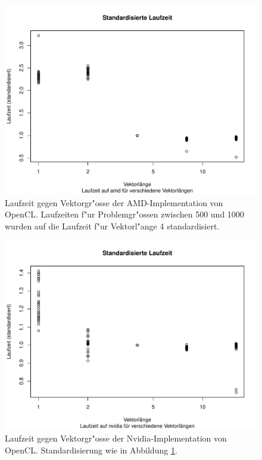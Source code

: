 \begin{figure}
\begin{center}
\includegraphics[width=\hsize]{images/vector-amd.pdf}
\end{center}
\caption{Laufzeit gegen Vektorgr"osse der AMD-Implementation von OpenCL.
Laufzeiten f"ur Problemgr"ossen zwischen 500 und 1000 wurden auf die
Laufzeit f"ur Vektorl"ange 4 standardisiert.
\label{opencl-simd-amd}}
\end{figure}

\begin{figure}
\begin{center}
\includegraphics[width=\hsize]{images/vector-nvidia.pdf}
\end{center}
\caption{Laufzeit gegen Vektorgr"osse der Nvidia-Implementation von OpenCL.
Standardisierung wie in Abbildung \ref{opencl-simd-amd}.
\label{opencl-simd-nvidia}}
\end{figure}

